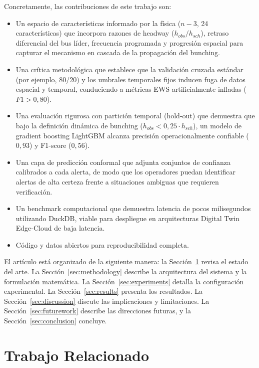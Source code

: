 \documentclass[fleqn,10pt,lineno]{wlpeerj}
\begin{document}
Concretamente, las contribuciones de este trabajo son:
\begin{itemize}
  \item Un espacio de caracter\'isticas informado por la f\'isica ($n{-}3$, 24 caracter\'isticas) que incorpora razones de headway ($h_{obs}/h_{sch}$), retraso diferencial del bus l\'ider, frecuencia programada y progresi\'on espacial para capturar el mecanismo en cascada de la propagaci\'on del bunching.
  \item Una cr\'itica metodol\'ogica que establece que la validaci\'on cruzada est\'andar (por ejemplo, 80/20) y los umbrales temporales fijos inducen fuga de datos espacial y temporal, conduciendo a m\'etricas EWS artificialmente infladas ($F1 > 0,80$).
  \item Una evaluaci\'on rigurosa con partici\'on temporal (hold-out) que demuestra que bajo la definici\'on din\'amica de bunching ($h_{obs} < 0,25 \cdot h_{sch}$), un modelo de gradient boosting LightGBM alcanza precisi\'on operacionalmente confiable ($0,93$) y F1-score ($0,56$).
  \item Una capa de predicci\'on conformal que adjunta conjuntos de confianza calibrados a cada alerta, de modo que los operadores puedan identificar alertas de alta certeza frente a situaciones ambiguas que requieren verificaci\'on.
  \item Un benchmark computacional que demuestra latencia de pocos milisegundos utilizando DuckDB, viable para despliegue en arquitecturas Digital Twin Edge-Cloud de baja latencia.
  \item C\'odigo y datos abiertos para reproducibilidad completa.
\end{itemize}

El art\'iculo est\'a organizado de la siguiente manera: la Secci\'on~\ref{sec:related} revisa el estado del arte. La Secci\'on~\ref{sec:methodology} describe la arquitectura del sistema y la formulaci\'on matem\'atica. La Secci\'on~\ref{sec:experiments} detalla la configuraci\'on experimental. La Secci\'on~\ref{sec:results} presenta los resultados. La Secci\'on~\ref{sec:discussion} discute las implicaciones y limitaciones. La Secci\'on~\ref{sec:futurework} describe las direcciones futuras, y la Secci\'on~\ref{sec:conclusion} concluye.

\section{Trabajo Relacionado}
\label{sec:related}
\end{document}
